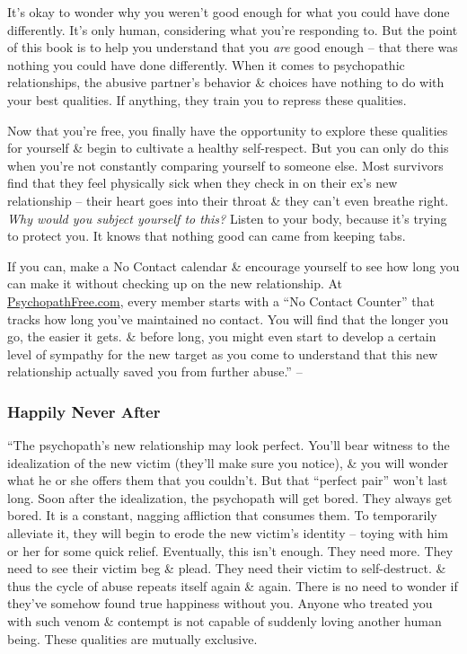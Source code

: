 \documentclass{article}
\numberwithin{equation}{section}
\begin{document}
It's okay to wonder why you weren't good enough for what you could have done differently. It's only human, considering what you're responding to. But the point of this book is to help you understand that you \textit{are} good enough -- that there was nothing you could have done differently. When it comes to psychopathic relationships, the abusive partner's behavior \& choices have nothing to do with your best qualities. If anything, they train you to repress these qualities.

Now that you're free, you finally have the opportunity to explore these qualities for yourself \& begin to cultivate a healthy self-respect. But you can only do this when you're not constantly comparing yourself to someone else. Most survivors find that they feel physically sick when they check in on their ex's new relationship -- their heart goes into their throat \& they can't even breathe right. \textit{Why would you subject yourself to this?} Listen to your body, because it's trying to protect you. It knows that nothing good can came from keeping tabs.

If you can, make a No Contact calendar \& encourage yourself to see how long you can make it without checking up on the new relationship. At \url{PsychopathFree.com}, every member starts with a ``No Contact Counter'' that tracks how long you've maintained no contact. You will find that the longer you go, the easier it gets. \& before long, you might even start to develop a certain level of sympathy for the new target as you come to understand that this new relationship actually saved you from further abuse.'' -- \cite[pp. 79--82]{MacKenzie2015}

\subsubsection{Happily Never After}
``The psychopath's new relationship may look perfect. You'll bear witness to the idealization of the new victim (they'll make sure you notice), \& you will wonder what he or she offers them that you couldn't. But that ``perfect pair'' won't last long. Soon after the idealization, the psychopath will get bored. They always get bored. It is a constant, nagging affliction that consumes them. To temporarily alleviate it, they will begin to erode the new victim's identity -- toying with him or her for some quick relief. Eventually, this isn't enough. They need more. They need to see their victim beg \& plead. They need their victim to self-destruct. \& thus the cycle of abuse repeats itself again \& again. There is no need to wonder if they've somehow found true happiness without you. Anyone who treated you with such venom \& contempt is not capable of suddenly loving another human being. These qualities are mutually exclusive.
\end{document}
